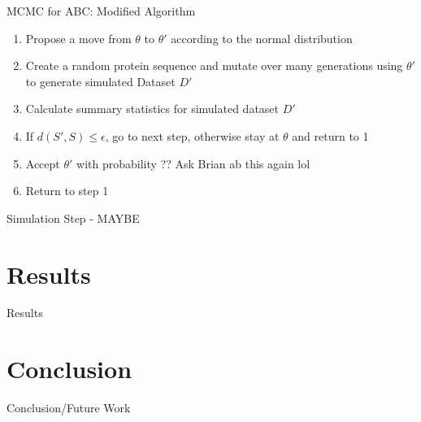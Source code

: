 \documentclass{beamer}
\begin{document}
	\begin{frame}{MCMC for ABC: Modified Algorithm}
		
		\begin{enumerate}
			\item Propose a move from $\theta$ to $\theta'$ according to the normal distribution
			\item Create a random protein sequence and mutate over many generations using $\theta'$ to generate simulated Dataset $D'$
			\item Calculate summary statistics for simulated dataset $D'$ 
			\item If $d(S',S) \le \epsilon$, go to next step, otherwise stay at $\theta$ and return to 1
			\item Accept $\theta'$ with probability ?? Ask Brian ab this again lol
			\item Return to step 1
		\end{enumerate}
	
	\end{frame}

	\begin{frame}{Simulation Step - MAYBE}
	
	
	\end{frame}

	\section{Results}
	\begin{frame}{Results}
		
		
	\end{frame}

	\section{Conclusion}
	\begin{frame}{Conclusion/Future Work}
		
		
	\end{frame}
		
\end{document}
